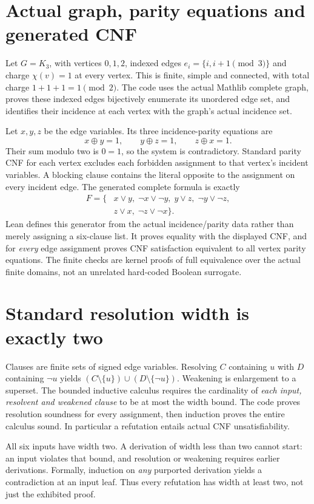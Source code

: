 \documentclass[10pt,a4paper]{article}
\begin{document}
\section{Actual graph, parity equations and generated CNF}
Let $G=K_3$, with vertices $0,1,2$, indexed edges $e_i=\{i,i+1\pmod3\}$ and charge
$\chi(v)=1$ at every vertex. This is finite, simple and connected, with total charge
$1+1+1=1\pmod2$. The code uses the actual Mathlib complete graph, proves these indexed
edges bijectively enumerate its unordered edge set, and identifies their incidence at each
vertex with the graph's actual incidence set.

Let $x,y,z$ be the edge variables. Its three incidence-parity equations are
\[
 x\oplus y=1,\qquad y\oplus z=1,\qquad z\oplus x=1.
\]
Their sum modulo two is $0=1$, so the system is contradictory. Standard parity CNF
for each vertex excludes each forbidden assignment to that vertex's incident variables.
A blocking clause contains the literal opposite to the assignment on every incident edge.
The generated complete formula is exactly
\begin{align*}
F=\{&x\vee y,\;\neg x\vee\neg y,\;y\vee z,\;\neg y\vee\neg z,\\
    &z\vee x,\;\neg z\vee\neg x\}.
\end{align*}
Lean defines this generator from the actual incidence/parity data rather than merely
assigning a six-clause list. It proves equality with the displayed CNF, and for \emph{every}
edge assignment proves CNF satisfaction equivalent to all vertex parity equations.
The finite checks are kernel proofs of full equivalence over the actual finite domains,
not an unrelated hard-coded Boolean surrogate.

\section{Standard resolution width is exactly two}
Clauses are finite sets of signed edge variables. Resolving $C$ containing $u$ with $D$
containing $\neg u$ yields $(C\setminus\{u\})\cup(D\setminus\{\neg u\})$.
Weakening is enlargement to a superset. The bounded inductive calculus requires the
cardinality of \emph{each input, resolvent and weakened clause} to be at most the width bound.
The code proves resolution soundness for every assignment, then induction proves the entire
calculus sound. In particular a refutation entails actual CNF unsatisfiability.

All six inputs have width two. A derivation of width less than two cannot start: an input
violates that bound, and resolution or weakening requires earlier derivations. Formally,
induction on \emph{any} purported derivation yields a contradiction at an input leaf.
Thus every refutation has width at least two, not just the exhibited proof.
\end{document}
